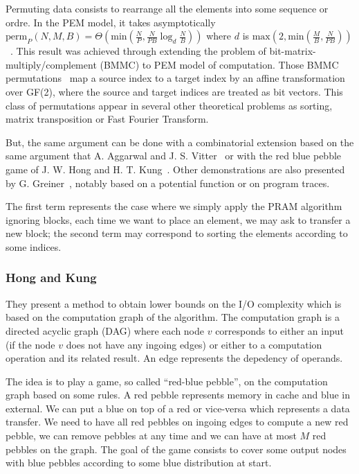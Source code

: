 Permuting data consists to rearrange all the elements into some sequence or ordre. In the PEM model, it takes asymptotically $\text{perm}_{P} (N, M, B) = \Theta(\text{min}(\frac{N}{P}, \frac{N}{PB} \log_{d} \frac{N}{B}))$ where $d$ is $\text{max}(2, \text{min}(\frac{M}{B}, \frac{N}{PB}))$~\cite{greiner2012sparse}. This result was achieved through extending the problem of bit-matrix-multiply/complement (BMMC) to PEM model of computation. Those BMMC permutations~\cite{cormen1998asymptotically} map a source index to a target index by an affine transformation over GF(2), where the source and target indices are treated as bit vectors. This class of permutations appear in several other theoretical problems as sorting, matrix transposition or Fast Fourier Transform.

But, the same argument can be done with a combinatorial extension based on the same argument that A. Aggarwal and J. S. Vitter~\cite{aggarwal1988input} or with the red blue pebble game of J. W. Hong and H. T. Kung~\cite{jia1981complexity}. Other demonstrations are also presented by G. Greiner~\cite{greiner2012sparse}, notably based on a potential function or on program traces.

The first term represents the case where we simply apply the PRAM algorithm ignoring blocks, each time we want to place an element, we may ask to transfer a new block; the second term may correspond to sorting the elements according to some indices.

\subsubsection{Hong and Kung}

They present a method to obtain lower bounds on the I/O complexity which is based on the computation graph of the algorithm. The computation graph is a directed acyclic graph (DAG) where each node $v$ corresponds to either an input (if the node $v$ does not have any ingoing edges) or either to a computation operation and its related result. An edge represents the depedency of operands.

The idea is to play a game, so called ``red-blue pebble'', on the computation graph based on some rules. A red pebble represents memory in cache and blue in external. We can put a blue on top of a red or vice-versa which represents a data transfer. We need to have all red pebbles on ingoing edges to compute a new red pebble, we can remove pebbles at any time and we can have at most $M$ red pebbles on the graph. The goal of the game consists to cover some output nodes with blue pebbles according to some blue distribution at start.

